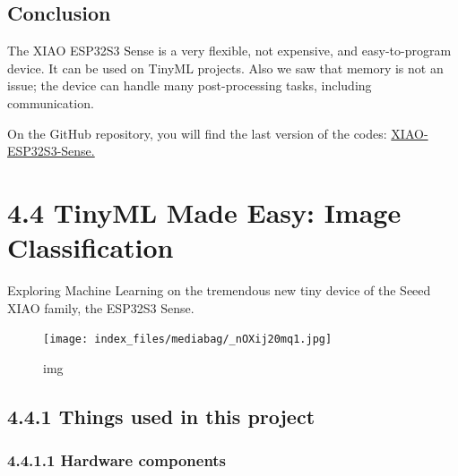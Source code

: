 \documentclass[
  letterpaper,
  DIV=11,
  numbers=noendperiod]{scrreprt}
\begin{document}
\hypertarget{conclusion}{%
\section*{Conclusion}\label{conclusion}}


The XIAO ESP32S3 Sense is a very flexible, not expensive, and
easy-to-program device. It can be used on TinyML projects. Also we saw
that memory is not an issue; the device can handle many post-processing
tasks, including communication.

On the GitHub repository, you will find the last version of the codes:
\href{https://github.com/Mjrovai/XIAO-ESP32S3-Sense}{XIAO-ESP32S3-Sense.}


\hypertarget{tinyml-made-easy-image-classification}{%
\chapter*{4.4 TinyML Made Easy: Image
Classification}\label{tinyml-made-easy-image-classification}}


Exploring Machine Learning on the tremendous new tiny device of the
Seeed XIAO family, the ESP32S3 Sense.

\begin{figure}[H]

{\centering \texttt{[image: index\_files/mediabag/\_nOXij20mq1.jpg]}

}

\caption{img}

\end{figure}

\hypertarget{things-used-in-this-project}{%
\section*{4.4.1 Things used in this
project}\label{things-used-in-this-project}}


\hypertarget{hardware-components}{%
\subsection*{4.4.1.1 Hardware components}\label{hardware-components}}
\end{document}
